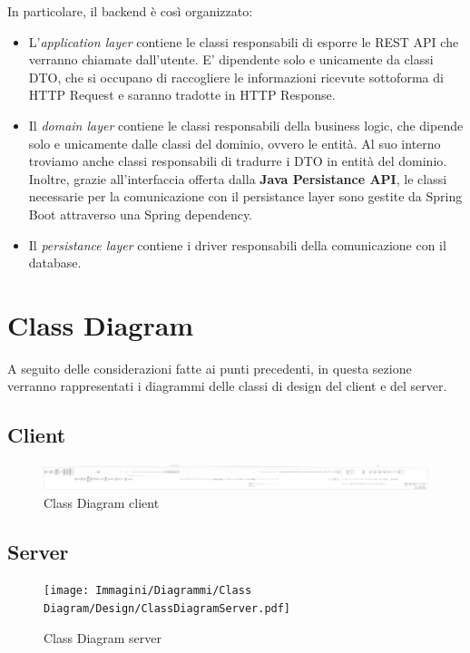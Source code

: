             In particolare, il backend è così organizzato:
            \begin{itemize}
                \item L'\textit{application layer} contiene le classi responsabili di esporre le REST API che verranno chiamate dall'utente. E' dipendente solo e unicamente da classi DTO, che si occupano di raccogliere le informazioni ricevute sottoforma di HTTP Request e saranno tradotte in HTTP Response. \cite{Baeldung2}
                \item Il \textit{domain layer} contiene le classi responsabili della business logic, che dipende solo e unicamente dalle classi del dominio, ovvero le entità. Al suo interno troviamo anche classi responsabili di tradurre i DTO in entità del dominio. \\
                Inoltre, grazie all'interfaccia offerta dalla \textbf{Java Persistance API}, le classi necessarie per la comunicazione con il persistance layer sono gestite da Spring Boot attraverso una Spring dependency.
                \item Il \textit{persistance layer} contiene i driver responsabili della comunicazione con il database.
            \end{itemize}

    \clearpage

    \section{Class Diagram}
        A seguito delle considerazioni fatte ai punti precedenti, in questa sezione verranno rappresentati i diagrammi delle classi di design del client e del server.
    
        \subsection{Client}
            \begin{figure}[htbp!]
                \includegraphics[width=0.9\linewidth]{Immagini/Diagrammi/Class Diagram/Design/ClassDiagramClient.pdf}
            \caption{Class Diagram client}
            \label{fig:Class Diagram client}
            \end{figure}
    
        \subsection{Server}
            \begin{figure}[htbp!]
                \texttt{[image: Immagini/Diagrammi/Class Diagram/Design/ClassDiagramServer.pdf]}
            \caption{Class Diagram server}
            \label{fig:Class Diagram server}
            \end{figure}

